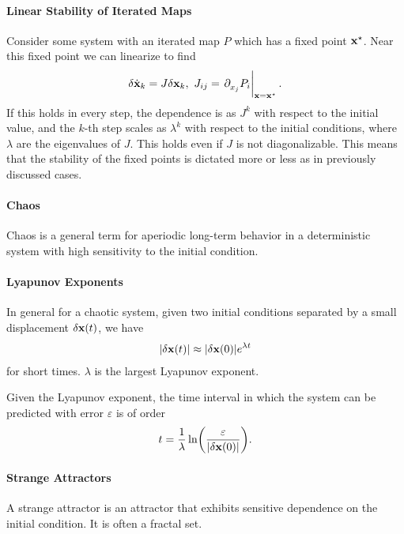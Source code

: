 \paragraph{Linear Stability of Iterated Maps}
Consider some system with an iterated map $P$ which has a fixed point $\vb{x}^{\star}$. Near this fixed point we can linearize to find
\begin{align*}
	\delta\dot{\vb{x}}_{k} = J\delta\vb{x}_{k},\ J_{ij} = \eval{\del{}{x_{j}}P_{i}}_{\vb{x} = \vb{x}^{\star}}.
\end{align*}
If this holds in every step, the dependence is as $J^{k}$ with respect to the initial value, and the $k$-th step scales as $\lambda^{k}$ with respect to the initial conditions, where $\lambda$ are the eigenvalues of $J$. This holds even if $J$ is not diagonalizable. This means that the stability of the fixed points is dictated more or less as in previously discussed cases.

\paragraph{Chaos}
Chaos is a general term for aperiodic long-term behavior in a deterministic system with high sensitivity to the initial condition.

\paragraph{Lyapunov Exponents}
In general for a chaotic system, given two initial conditions separated by a small displacement $\delta\vb{x}(t)$, we have
\begin{align*}
	\abs{\delta\vb{x}(t)} \approx \abs{\delta\vb{x}(0)}e^{\lambda t}
\end{align*}
for short times. $\lambda$ is the largest Lyapunov exponent.

Given the Lyapunov exponent, the time interval in which the system can be predicted with error $\varepsilon$ is of order
\begin{align*}
	t = \frac{1}{\lambda}\ln(\frac{\varepsilon}{\abs{\delta\vb{x}(0)}}).
\end{align*}

\paragraph{Strange Attractors}
A strange attractor is an attractor that exhibits sensitive dependence on the initial condition. It is often a fractal set.